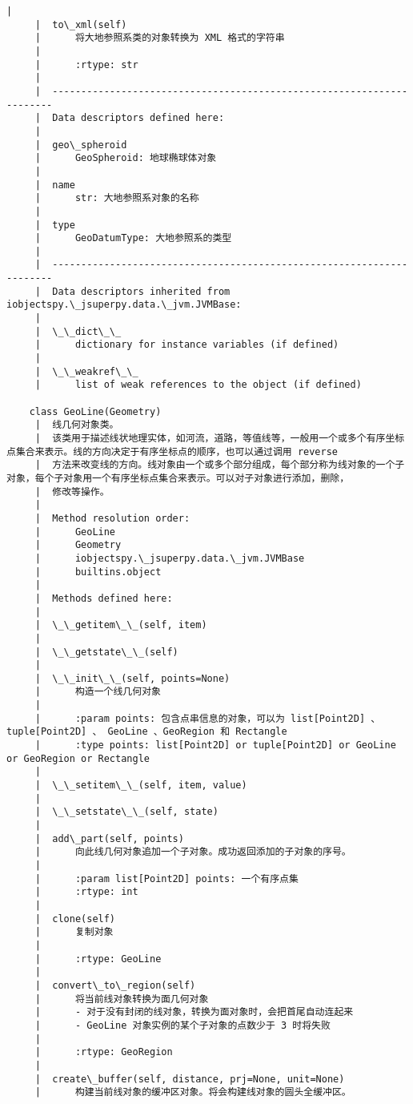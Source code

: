 \documentclass[11pt]{article}
\begin{document}
\begin{Verbatim}[commandchars=\\\{\}]
     |  
     |  to\_xml(self)
     |      将大地参照系类的对象转换为 XML 格式的字符串
     |      
     |      :rtype: str
     |  
     |  ----------------------------------------------------------------------
     |  Data descriptors defined here:
     |  
     |  geo\_spheroid
     |      GeoSpheroid: 地球椭球体对象
     |  
     |  name
     |      str: 大地参照系对象的名称
     |  
     |  type
     |      GeoDatumType: 大地参照系的类型
     |  
     |  ----------------------------------------------------------------------
     |  Data descriptors inherited from iobjectspy.\_jsuperpy.data.\_jvm.JVMBase:
     |  
     |  \_\_dict\_\_
     |      dictionary for instance variables (if defined)
     |  
     |  \_\_weakref\_\_
     |      list of weak references to the object (if defined)
    
    class GeoLine(Geometry)
     |  线几何对象类。
     |  该类用于描述线状地理实体，如河流，道路，等值线等，一般用一个或多个有序坐标点集合来表示。线的方向决定于有序坐标点的顺序，也可以通过调用 reverse
     |  方法来改变线的方向。线对象由一个或多个部分组成，每个部分称为线对象的一个子对象，每个子对象用一个有序坐标点集合来表示。可以对子对象进行添加，删除，
     |  修改等操作。
     |  
     |  Method resolution order:
     |      GeoLine
     |      Geometry
     |      iobjectspy.\_jsuperpy.data.\_jvm.JVMBase
     |      builtins.object
     |  
     |  Methods defined here:
     |  
     |  \_\_getitem\_\_(self, item)
     |  
     |  \_\_getstate\_\_(self)
     |  
     |  \_\_init\_\_(self, points=None)
     |      构造一个线几何对象
     |      
     |      :param points: 包含点串信息的对象，可以为 list[Point2D] 、tuple[Point2D] 、 GeoLine 、GeoRegion 和 Rectangle
     |      :type points: list[Point2D] or tuple[Point2D] or GeoLine or GeoRegion or Rectangle
     |  
     |  \_\_setitem\_\_(self, item, value)
     |  
     |  \_\_setstate\_\_(self, state)
     |  
     |  add\_part(self, points)
     |      向此线几何对象追加一个子对象。成功返回添加的子对象的序号。
     |      
     |      :param list[Point2D] points: 一个有序点集
     |      :rtype: int
     |  
     |  clone(self)
     |      复制对象
     |      
     |      :rtype: GeoLine
     |  
     |  convert\_to\_region(self)
     |      将当前线对象转换为面几何对象
     |      - 对于没有封闭的线对象，转换为面对象时，会把首尾自动连起来
     |      - GeoLine 对象实例的某个子对象的点数少于 3 时将失败
     |      
     |      :rtype: GeoRegion
     |  
     |  create\_buffer(self, distance, prj=None, unit=None)
     |      构建当前线对象的缓冲区对象。将会构建线对象的圆头全缓冲区。

\end{Verbatim}
\end{document}
